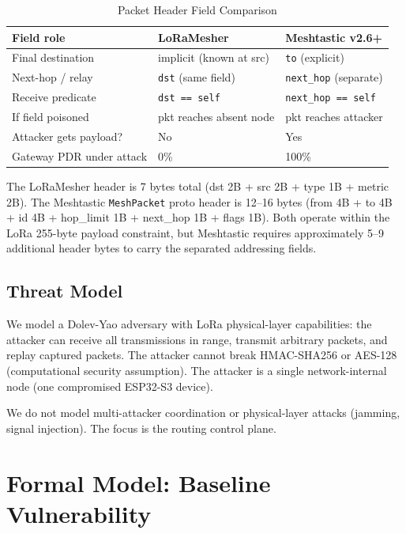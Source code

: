 \documentclass[journal]{IEEEtran}
\begin{document}
\begin{table}[h]
  \centering
  \caption{Packet Header Field Comparison}
  \label{tab:headers}
  \begin{tabular}{p{2.0cm}p{2.3cm}p{3.0cm}}
    \toprule
    Field role & LoRaMesher & Meshtastic v2.6+ \\
    \midrule
    Final destination & implicit (known at src) & \texttt{to} (explicit) \\
    Next-hop / relay & \texttt{dst} (same field) & \texttt{next\_hop} (separate) \\
    Receive predicate & \texttt{dst == self} & \texttt{next\_hop == self} \\
    If field poisoned & pkt reaches absent node & pkt reaches attacker \\
    Attacker gets payload? & No & Yes \\
    Gateway PDR under attack & 0\% & 100\% \\
    \bottomrule
  \end{tabular}
\end{table}

The LoRaMesher header is 7 bytes total (dst 2B + src 2B + type 1B + metric 2B).
The Meshtastic \texttt{MeshPacket} proto header is 12--16 bytes
(from 4B + to 4B + id 4B + hop\_limit 1B + next\_hop 1B + flags 1B).
Both operate within the LoRa 255-byte payload constraint, but Meshtastic
requires approximately 5--9 additional header bytes to carry the separated
addressing fields.

\subsection{Threat Model}

We model a Dolev-Yao adversary with LoRa physical-layer capabilities:
the attacker can receive all transmissions in range, transmit arbitrary
packets, and replay captured packets. The attacker cannot break HMAC-SHA256
or AES-128 (computational security assumption). The attacker is a single
network-internal node (one compromised ESP32-S3 device).

We do not model multi-attacker coordination or physical-layer attacks
(jamming, signal injection). The focus is the routing control plane.

\section{Formal Model: Baseline Vulnerability}
\label{sec:baseline}
\end{document}
